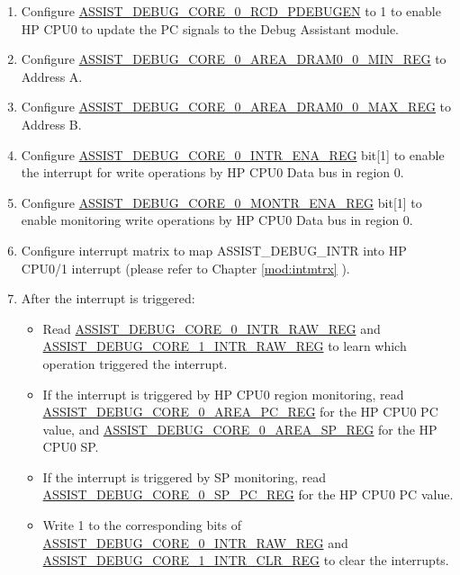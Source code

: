 \documentclass[main\_\_EN.tex]{subfiles}
\begin{document}
\begin{enumerate}
    \item Configure \hyperref[fielddesc:ASSISTDEBUGCORE0RCDPDEBUGEN]{ASSIST\_DEBUG\_CORE\_0\_RCD\_PDEBUGEN} to 1 to enable HP CPU0 to update the PC signals to the Debug Assistant module.
    \item Configure \hyperref[regdesc:ASSISTDEBUGCORE0AREADRAM00MINREG]{ASSIST\_DEBUG\_CORE\_0\_AREA\_DRAM0\_0\_MIN\_REG} to Address A.
    \item Configure \hyperref[regdesc:ASSISTDEBUGCORE0AREADRAM00MAXREG]{ASSIST\_DEBUG\_CORE\_0\_AREA\_DRAM0\_0\_MAX\_REG} to Address B.
    \item Configure \hyperref[regdesc:ASSISTDEBUGCORE0INTRENAREG]{ASSIST\_DEBUG\_CORE\_0\_INTR\_ENA\_REG} bit[1] to enable the interrupt for write operations by HP CPU0 Data bus in region 0.
    \item Configure \hyperref[regdesc:ASSISTDEBUGCORE0MONTRENAREG]{ASSIST\_DEBUG\_CORE\_0\_MONTR\_ENA\_REG} bit[1] to enable monitoring write operations by HP CPU0 Data bus in region 0.
    \item Configure interrupt matrix to map ASSIST\_DEBUG\_INTR into HP CPU0/1 interrupt (please refer to Chapter \ref{mod:intmtrx} \textit{}).
    \item After the interrupt is triggered:

    \begin{itemize}
        \item Read \hyperref[regdesc:ASSISTDEBUGCORE0INTRRAWREG]{ASSIST\_DEBUG\_CORE\_0\_INTR\_RAW\_REG} and \hyperref[regdesc:ASSISTDEBUGCORE1INTRRAWREG]{ASSIST\_DEBUG\_CORE\_1\_INTR\_RAW\_REG} to learn which operation triggered the interrupt.

        \item If the interrupt is triggered by HP CPU0 region monitoring, read \hyperref[regdesc:ASSISTDEBUGCORE0AREAPCREG]{ASSIST\_DEBUG\_CORE\_0\_AREA\_PC\_REG} for the HP CPU0 PC value, and \hyperref[regdesc:ASSISTDEBUGCORE0AREASPREG]{ASSIST\_DEBUG\_CORE\_0\_AREA\_SP\_REG} for the HP CPU0 SP.

        \item If the interrupt is triggered by SP monitoring, read \hyperref[regdesc:ASSISTDEBUGCORE0SPPCREG]{ASSIST\_DEBUG\_CORE\_0\_SP\_PC\_REG} for the HP CPU0 PC value.

        \item Write 1 to the corresponding bits of \hyperref[regdesc:ASSISTDEBUGCORE0INTRRAWREG]{ASSIST\_DEBUG\_CORE\_0\_INTR\_RAW\_REG} and \hyperref[regdesc:ASSISTDEBUGCORE1INTRCLRREG]{ASSIST\_DEBUG\_CORE\_1\_INTR\_CLR\_REG} to clear the interrupts.
    \end{itemize}

\end{enumerate}
\end{document}
